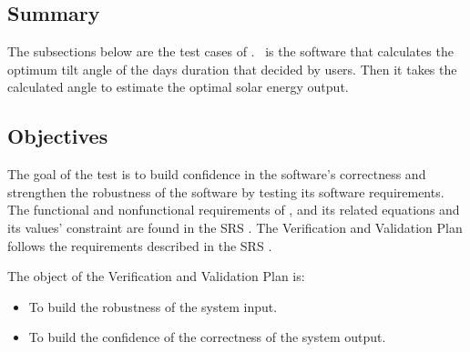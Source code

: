 \documentclass[12pt, titlepage]{article}
\begin{document}
\subsection{Summary}

The subsections below are the test cases of \progname. \progname ~is the
software that calculates the optimum tilt angle of the days duration that
decided by users. Then it takes the calculated angle to estimate the optimal
solar energy output.


\subsection{Objectives}\label{Objectives}

The goal of the test is to build confidence in the software's correctness and
strengthen the robustness of the software by testing its software requirements. The functional and nonfunctional requirements of \progname, and its related equations and its values' constraint are found in the SRS \cite{YS2019}. The Verification and Validation Plan follows the requirements described in the SRS \cite{YS2019}.

The object of the Verification and Validation Plan is:
\noindent \begin{itemize}

\item[ ] To build the robustness of the system input.
\item[ ] To build the confidence of the correctness of the system output.

\noindent \end{itemize}



\end{document}
